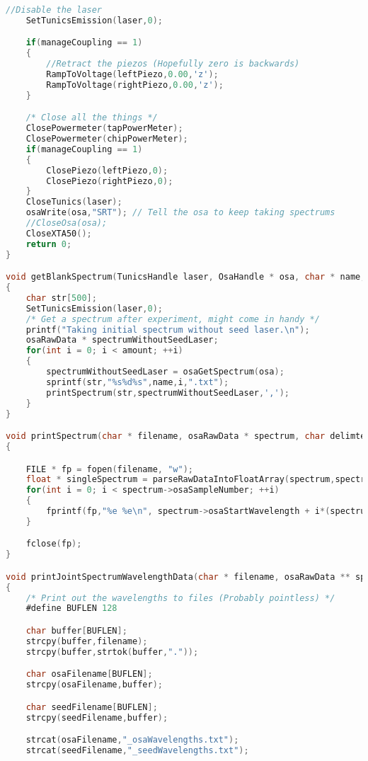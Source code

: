 \begin{lstlisting}[style=customc, language=C]
    //Disable the laser
    SetTunicsEmission(laser,0);

    if(manageCoupling == 1)
    {
        //Retract the piezos (Hopefully zero is backwards)
        RampToVoltage(leftPiezo,0.00,'z');
        RampToVoltage(rightPiezo,0.00,'z');
    }

    /* Close all the things */
    ClosePowermeter(tapPowerMeter);
    ClosePowermeter(chipPowerMeter);
    if(manageCoupling == 1)
    {
        ClosePiezo(leftPiezo,0);
        ClosePiezo(rightPiezo,0);
    }
    CloseTunics(laser);
    osaWrite(osa,"SRT"); // Tell the osa to keep taking spectrums
    //CloseOsa(osa);
    CloseXTA50();
    return 0;
}

void getBlankSpectrum(TunicsHandle laser, OsaHandle * osa, char * name, int amount)
{
    char str[500];
    SetTunicsEmission(laser,0);
    /* Get a spectrum after experiment, might come in handy */
    printf("Taking initial spectrum without seed laser.\n");
    osaRawData * spectrumWithoutSeedLaser;
    for(int i = 0; i < amount; ++i)
    {
        spectrumWithoutSeedLaser = osaGetSpectrum(osa);
        sprintf(str,"%s%d%s",name,i,".txt");
        printSpectrum(str,spectrumWithoutSeedLaser,',');
    }
}

void printSpectrum(char * filename, osaRawData * spectrum, char delimter)
{

    FILE * fp = fopen(filename, "w");
    float * singleSpectrum = parseRawDataIntoFloatArray(spectrum,spectrum->osaSampleNumber,'\n');
    for(int i = 0; i < spectrum->osaSampleNumber; ++i)
    {
        fprintf(fp,"%e %e\n", spectrum->osaStartWavelength + i*(spectrum->osaEndWavelength - spectrum->osaStartWavelength)/(float)spectrum->osaSampleNumber, singleSpectrum[i]);
    }

    fclose(fp);
}

void printJointSpectrumWavelengthData(char * filename, osaRawData ** spectrum, char delimter, int numberOfSeedReadings)
{
    /* Print out the wavelengths to files (Probably pointless) */
    #define BUFLEN 128

    char buffer[BUFLEN];
    strcpy(buffer,filename);
    strcpy(buffer,strtok(buffer,"."));

    char osaFilename[BUFLEN];
    strcpy(osaFilename,buffer);

    char seedFilename[BUFLEN];
    strcpy(seedFilename,buffer);

    strcat(osaFilename,"_osaWavelengths.txt");
    strcat(seedFilename,"_seedWavelengths.txt");


\end{lstlisting}
